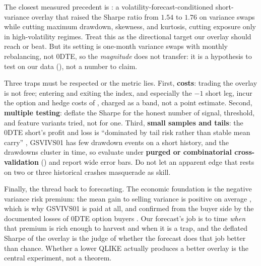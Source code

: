 \begin{application}
The closest measured precedent is \citet{Yang2024}: a volatility-forecast-conditioned short-variance overlay that raised the Sharpe ratio from $1.54$ to $1.76$ on variance swaps while cutting maximum drawdown, skewness, and kurtosis, cutting exposure only in high-volatility regimes. Treat this as the directional target our overlay should reach or beat. But its setting is one-month variance swaps with monthly rebalancing, not 0DTE, so the \emph{magnitude} does not transfer: it is a hypothesis to test on our data (), not a number to claim.
\end{application}

\begin{warning}
Three traps must be respected or the metric lies. First, \textbf{costs}: trading the overlay is not free; entering and exiting the index, and especially the $-1$ short leg, incur the option and hedge costs of , charged as a band, not a point estimate. Second, \textbf{multiple testing}: deflate the Sharpe for the honest number of signal, threshold, and feature variants tried, not for one. Third, \textbf{small samples and tails}: the 0DTE short's profit and loss is ``dominated by tail risk rather than stable mean carry'' \citep{Vilkov2024}, GSVIVS01 has few drawdown events on a short history, and the drawdowns cluster in time, so evaluate under \textbf{purged or combinatorial cross-validation} () and report wide error bars. Do not let an apparent edge that rests on two or three historical crashes masquerade as skill.
\end{warning}

Finally, the thread back to forecasting. The economic foundation is the negative variance risk premium: the mean gain to selling variance is positive on average \citep{BakshiKapadia2003}, which is why GSVIVS01 is paid at all, and confirmed from the buyer side by the documented losses of 0DTE option buyers \citep{BeckmeyerBrangerGayda2023}. Our forecast's job is to time \emph{when} that premium is rich enough to harvest and when it is a trap, and the deflated Sharpe of the overlay is the judge of whether the forecast does that job better than chance. Whether a lower QLIKE actually produces a better overlay is the central experiment, not a theorem.

